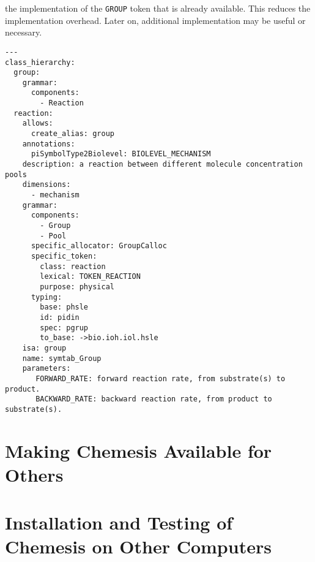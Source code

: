 \documentclass[12pt]{article}
\begin{document}
\begin{enumerate}
  the implementation of the {\tt GROUP} token that is already
  available.  This reduces the implementation overhead.  Later on,
  additional implementation may be useful or necessary.
\begin{verbatim}
---
class_hierarchy:
  group:
    grammar:
      components:
        - Reaction
  reaction:
    allows:
      create_alias: group
    annotations:
      piSymbolType2Biolevel: BIOLEVEL_MECHANISM
    description: a reaction between different molecule concentration pools
    dimensions:
      - mechanism
    grammar:
      components:
        - Group
        - Pool
      specific_allocator: GroupCalloc
      specific_token:
        class: reaction
        lexical: TOKEN_REACTION
        purpose: physical
      typing:
        base: phsle
        id: pidin
        spec: pgrup
        to_base: ->bio.ioh.iol.hsle
    isa: group
    name: symtab_Group
    parameters:
       FORWARD_RATE: forward reaction rate, from substrate(s) to product.
       BACKWARD_RATE: backward reaction rate, from product to substrate(s).
\end{verbatim}
\end{enumerate}


\section*{Making {\bf Chemesis} Available for Others}

\section*{Installation and Testing of {\bf Chemesis} on Other Computers}




\end{document}
